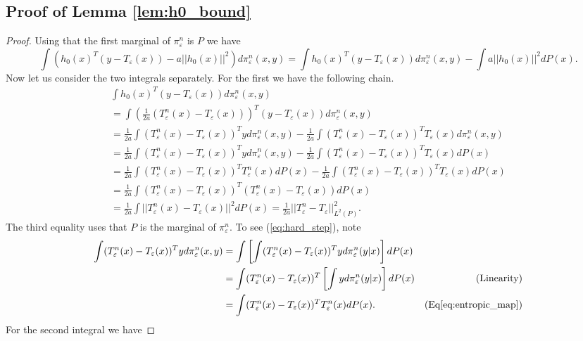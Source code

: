 \documentclass{article}
\theoremstyle{definition}
\newcommand{\Teps}{T_\varepsilon}
\begin{document}
\subsection{Proof of Lemma \ref{lem:h0_bound}}
\begin{proof}
Using that the first marginal of $\pi_\varepsilon^n$ is $P$ we have
\begin{equation}
    \int (h_0(x)^T(y - \Teps(x)) - a||h_0(x)||^2) d\pi_\varepsilon^n(x,y) = \int h_0(x)^T(y - \Teps(x)) d\pi_\varepsilon^n(x,y) - \int a ||h_0(x)||^2 dP(x). \label{eq:zeroth_int}
\end{equation}
Now let us consider the two integrals separately. For the first we have the following chain.
\begin{align}
    &\int h_0(x)^T(y - \Teps(x)) d\pi_\varepsilon^n(x,y)\nonumber \\
    &= \int \left (\frac{1}{2a}(\Teps^n(x) - \Teps(x))\right )^T(y - \Teps(x)) d\pi_\varepsilon^n(x,y) & \nonumber \\
    &=\frac{1}{2a} \int  (\Teps^n(x) - \Teps(x))^Ty  d\pi_\varepsilon^n(x,y) - \frac{1}{2a}\int (\Teps^n(x) - \Teps(x))^T\Teps(x)d\pi_\varepsilon^n(x,y) \nonumber \\
    &= \frac{1}{2a} \int  (\Teps^n(x) - \Teps(x))^Ty  d\pi_\varepsilon^n(x,y) - \frac{1}{2a}\int (\Teps^n(x) - \Teps(x))^T\Teps(x)dP(x)  \nonumber \\
    &= \frac{1}{2a} \int  (\Teps^n(x) - \Teps(x))^T\Teps^n(x)dP(x) - \frac{1}{2a}\int (\Teps^n(x) - \Teps(x))^T\Teps(x)dP(x) \label{eq:hard_step} \\
    &= \frac{1}{2a} \int  (\Teps^n(x) - \Teps(x))^T(\Teps^n(x) - \Teps(x))  dP(x)  \nonumber \\
    &= \frac{1}{2a} \int  ||\Teps^n(x) - \Teps(x)||^2 dP(x) = \frac{1}{2a} ||\Teps^n - \Teps||_{L^2(P)}^2.  \label{eq:first_int}
\end{align}
The third equality uses that $P$ is the marginal of $\pi_\varepsilon^n$. To see (\ref{eq:hard_step}), note
\begin{align*}
    \int  (\Teps^n(x) - \Teps(x))^Ty  d\pi_\varepsilon^n(x,y) &= \int  \left [ \int (\Teps^n(x) - \Teps(x))^Ty d\pi_\varepsilon^n(y|x) \right ]  dP(x) \\
    &= \int  (\Teps^n(x) - \Teps(x))^T\left [ \int y d\pi_\varepsilon^n(y|x) \right ]  dP(x) & (\text{Linearity}) \\
    &= \int  (\Teps^n(x) - \Teps(x))^T \Teps^n(x)  dP(x). & (\text{Eq} \ref{eq:entropic_map})
\end{align*}
For the second integral we have

\end{proof}
\end{document}
